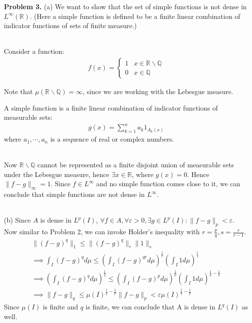 \documentclass{article}
\newcommand{\R}{\mathbb{R}}
\newcommand{\Q}{\mathbb{Q}}
\begin{document}
\textbf{Problem 3. } (a) We want to show that the set of simple functions is not dense in $L^{\infty}(\R)$. (Here a simple function is defined to be a finite linear combination of indicator functions of sets of finite measure.)
\\~

Consider a function:
\begin{gather*}
    f(x) = \begin{cases}
        1 & x \in \R\backslash\Q \\
        0 & x \in \Q
    \end{cases}
\end{gather*}

Note that $\mu(\R\backslash\Q) = \infty$, since we are working with the Lebesgue measure.

A simple function is a finite linear combination of indicator functions of measurable sets:
\begin{gather*}
    g(x) = \sum_{k=1}^n a_k 1_{A_k(x)}
\end{gather*}
where $a_1,\cdots,a_n$ is a sequence of real or complex numbers.
\\~

Now $\R\backslash\Q$ cannot be represented as a finite disjoint union of measurable sets under the Lebesgue measure, hence $\exists x\in \R$, where $g(x) = 0$. Hence $\lVert f - g\rVert_{\infty} = 1$. Since $f \in L^{\infty}$ and no simple function comes close to it, we can conclude that simple functions are not dense in $L^{\infty}$.
\\~

(b) Since $A$ is dense in $L^p(I)$, $\forall f\in A, \forall \varepsilon > 0, \exists g \in L^{p}(I): \lVert f-g \rVert_{p} < \varepsilon$. Now similar to Problem 2, we can invoke Holder's inequality with $r = \frac{p}{q}, s = \frac{r}{r-1}$.
\begin{gather*}
     \lVert (f-g)^q \rVert_1 \leq \lVert (f-g)^q \rVert_r \lVert 1 \rVert_s\\
     \implies \int_I (f-g)^q d\mu \leq \left( \int_I (f-g)^{qr} d\mu \right)^{\frac{1}{r}} \left(\int_I 1 d\mu\right)^{\frac{1}{s}}\\
     \implies \left( \int_I (f-g)^q d\mu \right)^{\frac{1}{q}} \leq \left( \int_I (f-g)^{p} d\mu \right)^{\frac{1}{p}} \left(\int_I 1 d\mu\right)^{\frac{1}{q} - \frac{1}{p}} \\
     \implies \lVert f-g \rVert_q \leq  \mu(I)^{\frac{1}{q} - \frac{1}{p}} \lVert f-g \rVert_p < \varepsilon \mu(I)^{\frac{1}{q} - \frac{1}{p}}
\end{gather*}
Since $\mu(I)$ is finite and $q$ is finite, we can conclude that A is dense in $L^q(I)$ as well.
\\~
\end{document}
